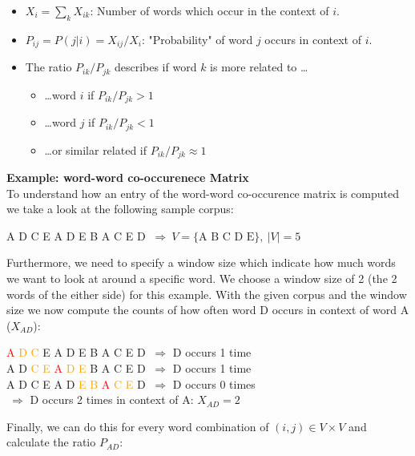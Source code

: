 \begin{itemize}
  \item $X_i = \sum_k X_{ik}$: Number of words which occur in the context of $i$.
  \item $P_{ij} = P(j | i) = X_{ij} / X_i$: "Probability" of word $j$ occurs in context of $i$.
  \item The ratio $P_{ik} / P_{jk}$ describes if word $k$ is more related to \dots
    \begin{itemize}
      \item \dots word $i$ if  $P_{ik} / P_{jk} > 1$
      \item \dots word $j$ if $P_{ik} / P_{jk} < 1$
      \item \dots or similar related if $P_{ik} / P_{jk} \approx 1$    
    \end{itemize}
\end{itemize}

\textbf{Example: word-word co-occurenece Matrix} \\

To understand how an entry of the word-word co-occurence matrix is computed we take a 
look at the following sample corpus:

\begin{center}
A D C E A D E B A C E D $\ \Rightarrow\ V = \{\text{A B C D E}\},\ |V| = 5$
\end{center}

Furthermore, we need to specify a window size which indicate how much words we want to look
at around a specific word. We choose a window size of 2 (the 2 words of the either side)  
for this example. With the given corpus and the window size we now compute the counts of
how often word D occurs in context of word A ($X_{AD}$):

\begin{center}
\textcolor{red}{A} \textcolor{orange}{D C} E A D E B A C E D $\ \Rightarrow$ D occurs 1 time \\
A D \textcolor{orange}{C E} \textcolor{red}{A} \textcolor{orange}{D E} B A C E D $\ \Rightarrow$ D occurs 1 time \\
A D C E A D \textcolor{orange}{E B} \textcolor{red}{A} \textcolor{orange}{C E} D $\ \Rightarrow$ D occurs 0 times \\
\phantom{A D C E A D E B A C E D} $\ \Rightarrow$ D occurs 2 times in context of A: $X_{AD} = 2$
\end{center}

Finally, we can do this for every word combination of $(i, j) \in V \times V$ and calculate the 
ratio $P_{AD}$:

